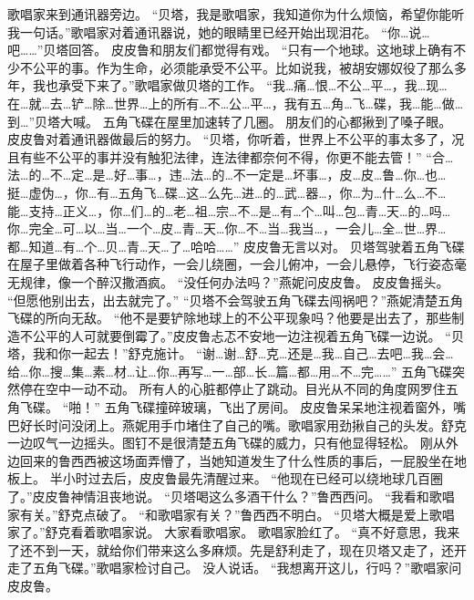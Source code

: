 \documentclass[a4paper,12pt,UTF8,twoside]{ctexbook}
\begin{document}
        歌唱家来到通讯器旁边。  
        “贝塔，我是歌唱家，我知道你为什么烦恼，希望你能听我一句话。”歌唱家对着通讯器说，她的眼睛里已经开始出现泪花。  
        “你…说…吧……”贝塔回答。  
        皮皮鲁和朋友们都觉得有戏。  
        “只有一个地球。这地球上确有不少不公平的事。作为生命，必须能承受不公平。比如说我，被胡安娜奴役了那么多年，我也承受下来了。”歌唱家做贝塔的工作。  
        “我…痛…恨…不公…平…，我…现…在…就…去…铲…除…世界…上的所有…不…公…平…，我有五…角…飞…碟，我…能…做…到…”贝塔大喊。  
        五角飞碟在屋里加速转了几圈。  
        朋友们的心都揪到了嗓子眼。  
        皮皮鲁对着通讯器做最后的努力。  
        “贝塔，你听着，世界上不公平的事太多了，况且有些不公平的事并没有触犯法律，连法律都奈何不得，你更不能去管！”  
        “合…法…的…不…定…是…好…事…，违…法…的…不一定是…坏事…，皮…皮…鲁…你…也…挺…虚伪…，你…有…五角飞…碟…这…么先…进…的…武…器…，你…为…什…么…不…能…支持…正义…，你…们…的…老…祖…宗…不…是…有…个…叫…包…青…天…的…吗…你…完全…可…以…当…一个…皮…青…天…你…不…当…我当…，一会儿…全…世…界…都…知道…有…个…贝…青…天…了…哈哈……”  
        皮皮鲁无言以对。  
        贝塔驾驶着五角飞碟在屋子里做着各种飞行动作，一会儿绕圈，一会儿俯冲，一会儿悬停，飞行姿态毫无规律，像一个醉汉撒酒疯。        
        “没任何办法吗？”燕妮问皮皮鲁。  
        皮皮鲁摇头。  
        “但愿他别出去，出去就完了。”  
        “贝塔不会驾驶五角飞碟去闯祸吧？”燕妮清楚五角飞碟的所向无敌。  
        “他不是要铲除地球上的不公平现象吗？他要是出去了，那些制造不公平的人可就要倒霉了。”皮皮鲁忐忑不安地一边注视着五角飞碟一边说。  
        “贝塔，我和你一起去！”舒克施计。  
        “谢…谢…舒…克…还是…我…自己…去吧…我…会…给…你…搜…集…素…材…让…你…再写…一…部…长…篇…都…用…不…完……”  
        五角飞碟突然停在空中一动不动。  
        所有人的心脏都停止了跳动。目光从不同的角度网罗住五角飞碟。  
        “啪！”  
        五角飞碟撞碎玻璃，飞出了房间。  
        皮皮鲁呆呆地注视着窗外，嘴巴好长时问没闭上。燕妮用手巾堵住了自己的嘴。歌唱家用劲揪自己的头发。舒克一边叹气一边摇头。图钉不是很清楚五角飞碟的威力，只有他显得轻松。  
        刚从外边回来的鲁西西被这场面弄懵了，当她知道发生了什么性质的事后，一屁股坐在地板上。  
        半小时过去后，皮皮鲁最先清醒过来。        
        “他现在已经可以绕地球几百圈了。”皮皮鲁神情沮丧地说。  
        “贝塔喝这么多酒干什么？”鲁西西问。  
        “我看和歌唱家有关。”舒克点破了。  
        “和歌唱家有关？”鲁西西不明白。  
        “贝塔大概是爱上歌唱家了。”舒克看着歌唱家说。  
        大家看歌唱家。  
        歌唱家脸红了。  
        “真不好意思，我来了还不到一天，就给你们带来这么多麻烦。先是舒利走了，现在贝塔又走了，还开走了五角飞碟。”歌唱家检讨自己。  
        没人说话。  
        “我想离开这儿，行吗？”歌唱家问皮皮鲁。  
\end{document}
